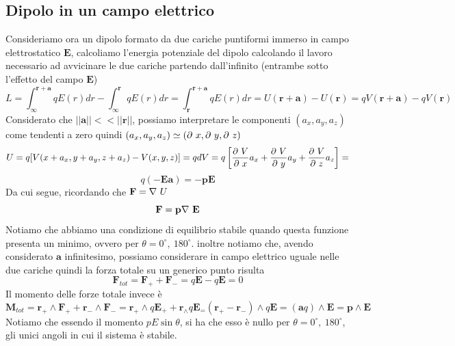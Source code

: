 \documentclass[
10pt, %
a4paper, %
oneside, %
headinclude,footinclude, %
BCOR5mm, %
]{scrartcl}
\begin{document}
\subsection{Dipolo in un campo elettrico}
Consideriamo ora un dipolo formato da due cariche puntiformi immerso in campo elettrostatico $\mathbf{E}$, calcoliamo l'energia potenziale del dipolo calcolando il lavoro necessario ad avvicinare le due cariche partendo dall'infinito (entrambe sotto l'effetto del campo $\mathbf{E}$)
\[L = \int_{\infty}^{\mathbf{r}+\mathbf{a}} qE(r) dr -\int_{\infty}^{\mathbf{r}} qE(r) dr =\int_{\mathbf{r}}^{\mathbf{r}+\mathbf{a}} qE(r) dr= U(\mathbf{r}+\mathbf{a})-U(\mathbf{r}) = qV(\mathbf{r}+\mathbf{a})-qV(\mathbf{r})\]
Considerato che $||\mathbf{a}||<<||\mathbf{r}||$, possiamo interpretare le componenti \((a_x, a_y, a_z)\) come tendenti a zero quindi \((a_x, a_y, a_z)\simeq (\partial\  x, \partial\  y, \partial\  z)\)
\[U = q[V(x+a_x, y+a_y, z+a_z)-V(x, y, z)] = qdV = q\left[\frac{\partial\  V}{\partial\  x} a_x + \frac{\partial\  V}{\partial\  y}a_y + \frac{\partial\  V}{\partial\  z}a_z\right] =\]
\[ q(-\mathbf{E}\mathbf{a}) = -\mathbf{p}\mathbf{E}\]
Da cui segue, ricordando che \(\mathbf{F} = \mathbf{\nabla\ } U\)
\[\mathbf{F} = \mathbf{p}\mathbf{\nabla\ }\mathbf{E}\]
Notiamo che abbiamo una condizione di equilibrio stabile quando questa funzione presenta un minimo, ovvero per \(\theta= 0^\circ,\ 180^\circ\). inoltre notiamo che, avendo considerato $\mathbf{a}$ infinitesimo, possiamo considerare in campo elettrico uguale nelle due cariche quindi la forza totale su un generico punto risulta 
\[\mathbf{F}_{tot} =\mathbf{F}_++\mathbf{F}_- = q\mathbf{E}-q\mathbf{E} = 0\]
Il momento delle forze totale invece è
\[\mathbf{M}_{tot} = \mathbf{r}_+\wedge\mathbf{F}_+ + \mathbf{r}_-\wedge\mathbf{F}_- = \mathbf{r}_+\wedge q\mathbf{E}_+ + \mathbf{r}_\wedge q\mathbf{E}_ = (\mathbf{r}_+ - \mathbf{r}_-)\wedge q \mathbf{E} = (\mathbf{a}q)\wedge\mathbf{E} = \mathbf{p}\wedge\mathbf{E}\]
Notiamo che essendo il momento \(pE\sin\theta\), si ha che esso è nullo per \(\theta= 0^\circ,\ 180^\circ\), gli unici angoli in cui il sistema è stabile. 
\end{document}
